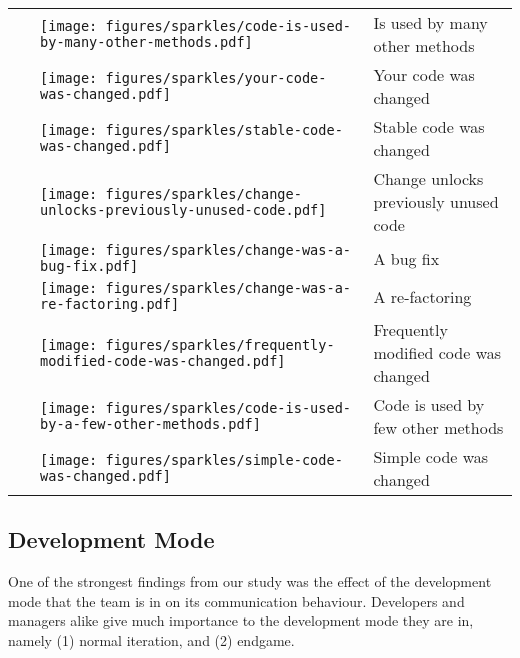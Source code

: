 \begin{table}[t!]
\begin{tabular}{rll}
&\vspace{-2pt}\texttt{[image: figures/sparkles/code-is-used-by-many-other-methods.pdf]} & Is used by many other methods\\
&\vspace{-2pt}\texttt{[image: figures/sparkles/your-code-was-changed.pdf]} & Your code was changed \\
&\vspace{-2pt}\texttt{[image: figures/sparkles/stable-code-was-changed.pdf]} & Stable code was changed\\
&\vspace{-2pt}\texttt{[image: figures/sparkles/change-unlocks-previously-unused-code.pdf]} & Change unlocks previously unused code\\\
&\vspace{-2pt}\texttt{[image: figures/sparkles/change-was-a-bug-fix.pdf]} & A bug fix\\	
&\vspace{-2pt}\texttt{[image: figures/sparkles/change-was-a-re-factoring.pdf]} & A re-factoring\\ 
&\vspace{-2pt}\texttt{[image: figures/sparkles/frequently-modified-code-was-changed.pdf]} & Frequently modified code was changed \\
&\vspace{-2pt}\texttt{[image: figures/sparkles/code-is-used-by-a-few-other-methods.pdf]} & Code is used by few other methods\\ 
&\vspace{-2pt}\texttt{[image: figures/sparkles/simple-code-was-changed.pdf]} & Simple code was changed\\
\bottomrule
\end{tabular}
\vspace{-5pt}
\label{tab:sparkle}
\end{table}


\subsection{Development Mode}
One of the strongest findings from our study was the effect of the development mode that the team is in on its communication behaviour. Developers and managers alike give much importance to the development mode they are in, namely (1) normal iteration, and (2) endgame.

